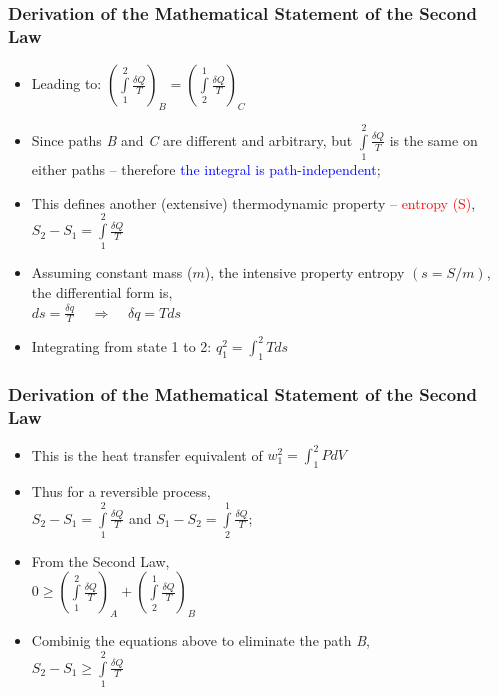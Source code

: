 \documentclass[10pt,compress]{beamer}
\begin{document}
\begin{frame}
 \frametitle{Derivation of the Mathematical Statement of the Second Law}
   \begin{itemize}
    \item <2-> Leading to:
          $\left( \displaystyle\int\limits_{1}^{2} \displaystyle\frac{\delta Q}{T} \right)_{B} = \left( \displaystyle\int\limits_{2}^{1} \displaystyle\frac{\delta Q}{T} \right)_{C} $
    \item <3-> Since paths {\it B} and {\it C} are different and arbitrary, but $\displaystyle\int\limits_{1}^{2}\displaystyle\frac{\delta Q}{T}$ is the same on either paths -- therefore \textcolor{blue}{the integral is path-independent};
    \item <4-> This defines another (extensive) thermodynamic property -- \textcolor{red}{entropy (S)}, \\
          $S_{2} - S_{1} = \displaystyle\int\limits_{1}^{2}\displaystyle\frac{\delta Q}{T}$
    \item <5-> Assuming constant mass ($m$), the intensive property entropy $\left(s=S/m\right)$, the differential form is, \\
          $ds = \displaystyle\frac{\delta q}{T} \;\;\;\; \Longrightarrow \;\;\;\; \delta q = Tds$
    \item <6-> Integrating from state 1 to 2: $q_{1}^{2} = \displaystyle\int_{1}^{2} Tds$    
   \end{itemize}
 \normalsize
\end{frame}


\begin{frame}
 \frametitle{Derivation of the Mathematical Statement of the Second Law}
   \begin{itemize}
  \item <1-> This is the heat transfer equivalent of $w_{1}^{2}=\displaystyle\int_{1}^{2}PdV$
  \item <2-> Thus for a reversible process, \\
       $S_{2} - S_{1} = \displaystyle\int\limits_{1}^{2}\displaystyle\frac{\delta Q}{T}$ and $S_{1} - S_{2} = \displaystyle\int\limits_{2}^{1}\displaystyle\frac{\delta Q}{T}$;
  \item <3-> From the Second Law, \\
       $0 \geq \left( \displaystyle\int\limits_{1}^{2}\displaystyle\frac{\delta Q}{T} \right)_{A} + \left( \displaystyle\int\limits_{2}^{1}\displaystyle\frac{\delta Q}{T} \right)_{B}$ 
  \item <4-> Combinig the equations above to eliminate the path {\it B}, \\
        $S_{2}-S_{1} \geq \displaystyle\int\limits_{1}^{2}\displaystyle\frac{\delta Q}{T}$
 \end{itemize}
 \normalsize
\end{frame}
\end{document}
